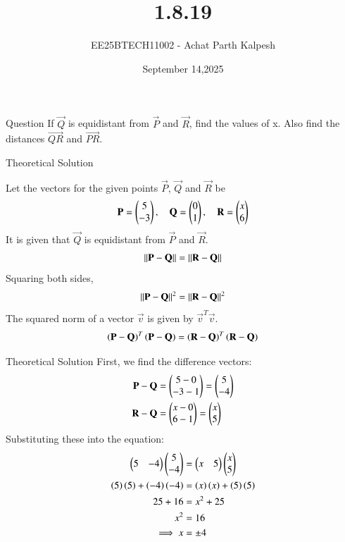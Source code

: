 \documentclass{beamer}
\title %
{1.8.19}
\date{September 14,2025}
\author %
{EE25BTECH11002 - Achat Parth Kalpesh}
\begin{document}
\frame{\titlepage}

\begin{frame}{Question}
If $\vec{Q}$ is equidistant from $\vec{P}$ and $\vec{R}$, find the values of x. Also find the distances $\vec{QR}$ and $\vec{PR}$.
\end{frame}



\begin{frame}{Theoretical Solution}

Let the vectors for the given points $\vec{P}$, $\vec{Q}$ and $\vec{R}$ be
\begin{align}
    \mathbf{P} = \begin{pmatrix}5 \\ -3\end{pmatrix}, \quad \mathbf{Q} = \begin{pmatrix}0 \\ 1\end{pmatrix}, \quad \mathbf{R} = \begin{pmatrix}x \\ 6\end{pmatrix}
\end{align}
It is given that $\vec{Q}$ is equidistant from $\vec{P}$ and $\vec{R}$.
\begin{align}
\left\lVert\mathbf{P} - \mathbf{Q}\right\rVert = \left\lVert\mathbf{R} - \mathbf{Q}\right\rVert
\end{align}
Squaring both sides,
\begin{align}
\left\lVert\mathbf{P} - \mathbf{Q}\right\rVert^2 = \left\lVert\mathbf{R} - \mathbf{Q}\right\rVert^2
\end{align}
The squared norm of a vector $\vec{v}$ is given by $\vec{v}^T\vec{v}$.
\begin{align}
\left(\mathbf{P} - \mathbf{Q}\right)^T \left(\mathbf{P} - \mathbf{Q}\right) = \left(\mathbf{R} - \mathbf{Q}\right)^T \left(\mathbf{R} - \mathbf{Q}\right)
\end{align}

\end{frame}

\begin{frame}{Theoretical Solution}
First, we find the difference vectors:
\begin{align}
    \mathbf{P} - \mathbf{Q} &= \begin{pmatrix}5 - 0 \\ -3 - 1\end{pmatrix} = \begin{pmatrix}5 \\ -4\end{pmatrix} \\
    \mathbf{R} - \mathbf{Q} &= \begin{pmatrix}x - 0 \\ 6 - 1\end{pmatrix} = \begin{pmatrix}x \\ 5\end{pmatrix}
\end{align}
Substituting these into the equation:
\begin{align}
    \begin{pmatrix} 5 & -4\end{pmatrix} \begin{pmatrix}5 \\ -4\end{pmatrix} &= \begin{pmatrix} x & 5 \end{pmatrix} \begin{pmatrix}x \\ 5\end{pmatrix} \\
    \left(5\right)\left(5\right) + \left(-4\right)\left(-4\right) &= \left(x\right)\left(x\right) + \left(5\right)\left(5\right) \\
    25 + 16 &= x^2 + 25 \\
    x^2 &= 16 \\
    \implies x &= \pm 4
\end{align}
\end{frame}
\end{document}
